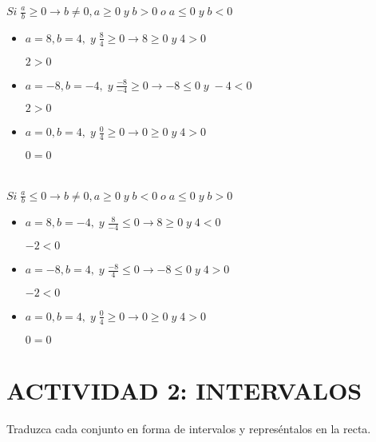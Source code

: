 \documentclass[12pt, letterpaper, twoside]{article}
\begin{document}
$Si \; \frac{a}{b} \geq 0 \to b \neq 0, a \geq 0 \;y\; b > 0 \; o \; a  \leq  0 \;y\; b < 0$

\begin{itemize}
    \item $a = 8, b = 4, \;y\; \frac{8}{4} \geq 0 \to 8 \geq 0 \;y\; 4 > 0$
    
    $2 > 0$

    \item $a = -8, b = -4, \;y\; \frac{-8}{-4} \geq 0 \to -8  \leq  0 \;y\; -4 < 0$
    
    $2 > 0$
    
    \item $a = 0, b = 4, \;y\; \frac{0}{4} \geq 0 \to 0 \geq 0 \;y\; 4 > 0$
    
    $0 = 0$
\end{itemize}

\section{}

$Si \; \frac{a}{b}  \leq  0 \to b \neq 0, a \geq 0 \;y\; b < 0 \; o \; a  \leq  0 \;y\; b > 0$

\begin{itemize}
    \item $a = 8, b = -4, \;y\; \frac{8}{-4}  \leq  0 \to 8 \geq 0 \;y\; 4 < 0$
    
    $-2 < 0$

    \item $a = -8, b = 4, \;y\; \frac{-8}{4}  \leq  0 \to -8  \leq  0 \;y\; 4 > 0$
    
    $-2 < 0$
    
    \item $a = 0, b = 4, \;y\; \frac{0}{4} \geq 0 \to 0 \geq 0 \;y\; 4 > 0$
    
    $0 = 0$
\end{itemize}

\section*{ACTIVIDAD 2: INTERVALOS}

Traduzca cada conjunto en forma de intervalos y represéntalos en la recta.
\end{document}
